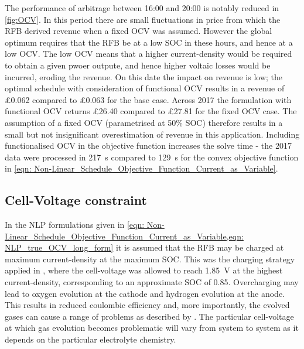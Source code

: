 \documentclass[preprint,3p,review,authoryear,10pt]{elsarticle}
\begin{document}
The performance of arbitrage between 16:00 and 20:00 is notably reduced in \cref{fig:OCV}. In this period there are small fluctuations in price from which the RFB derived revenue when a fixed OCV was assumed. However the global optimum requires that the RFB be at a low SOC in these hours, and hence at a low OCV. The low OCV means that a higher current-density would be required to obtain a given pwoer outpute, and hence higher voltaic losses would be incurred, eroding the revenue. On this date the impact on revenue is low; the optimal schedule with consideration of functional OCV results in a revenue of \pounds 0.062 compared to \pounds 0.063 for the base case. Across 2017 the formulation with functional OCV returns \pounds 26.40 compared to \pounds 27.81 for the fixed OCV case. The assumption of a fixed OCV (parametrised at 50\% SOC) therefore results in a small but not insignificant overestimation of revenue in this application. Including functionalised OCV in the objective function increases the solve time - the 2017 data were processed in \SI{217}{\second} compared to \SI{129}{\second} for the convex objective function in \cref{eqn: Non-Linear_Schedule_Objective_Function_Current_as_Variable}. 


\subsection{Cell-Voltage constraint}
\label{Results_Cell_Voltage_Constraint}
In the NLP formulations given in \cref{eqn: Non-Linear_Schedule_Objective_Function_Current_as_Variable,eqn: NLP_true_OCV_long_form} it is assumed that the RFB may be charged at maximum current-density at the maximum SOC. This was the charging strategy applied in \cite{Reed2016}, where the cell-voltage was allowed to reach \SI{1.85}{\volt} at the highest current-density, corresponding to an approximate SOC of 0.85. Overcharging may lead to oxygen evolution at the cathode and hydrogen evolution at the anode. This results in reduced coulombic efficiency and, more importantly, the evolved gases can cause a range of problems as described by \cite{Kear2012}.  The particular cell-voltage at which gas evolution becomes problematic will vary from system to system as it depends on the particular electrolyte chemistry. 
\end{document}
